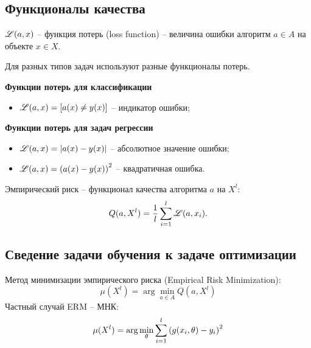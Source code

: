 \begin{multicols}{2}
    \subsection*{Функционалы качества}
    $\mathscr{L}(a,x)$ -- функция потерь (loss function) -- величина ошибки алгоритм $a\in A$ на объекте $x\in X$.
    \par
    Для разных типов задач используют разные функционалы потерь.
    \par
    \textbf{Функции потерь для классификации}
    \begin{itemize}
      \item $\mathscr{L}(a,x) = \left[a(x) \neq y(x)\right]$ -- индикатор ошибки;
    \end{itemize}
    \par
    \textbf{Функции потерь для задач регрессии}
    \begin{itemize}
      \item $\mathscr{L}(a,x) = \left|a(x) - y(x)\right|$ -- абсолютное значение ошибки;
      \item $\mathscr{L}(a,x) = \left(a(x) - y(x)\right)^2$ -- квадратичная ошибка.
    \end{itemize}   
    Эмпирический риск -- функционал качества алгоритма $a$ на $X^l$:
    \[
        Q(a, X^l) = \dfrac{1}{l} \sum\limits_{i=1}^{l} \mathscr{L}(a,x_i).
    \]
    \subsection*{Сведение задачи обучения к задаче оптимизации}
    Метод минимизации эмпирического риска (Empirical Risk Minimization):
    \[
        \mu(X^l) = \arg \min\limits_{a\in A} Q(a, X^l)
    \]
    Частный случай ERM -- МНК:
    \[
        \mu (X^l) = \arg\min\limits_{\theta} \sum\limits_{i=1}^{l} \left(g(x_i, \theta) - y_i\right)^2
    \]

\end{multicols}
